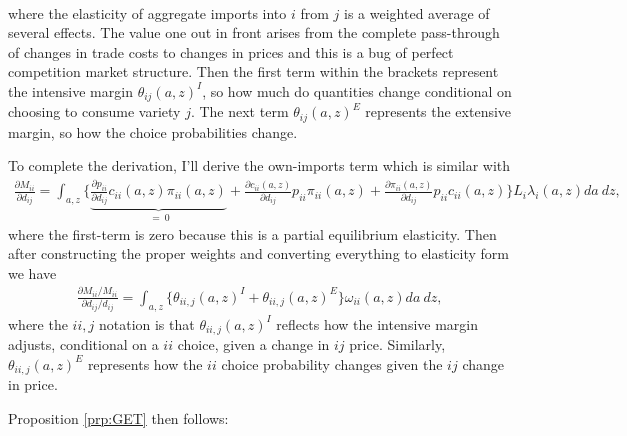 \documentclass[12pt,pdftex]{article}
\begin{document}
\begin{onehalfspacing}
\begin{align}
\end{align}
where the elasticity of aggregate imports into $i$ from $j$ is a weighted average of several effects. The value one out in front arises from the complete pass-through of changes in trade costs to changes in prices and this is a bug of perfect competition market structure. Then the first term within the brackets represent the intensive margin $\theta_{ij}(a,z)^{I}$, so how much do quantities change conditional on choosing to consume variety $j$. The next term $\theta_{ij}(a,z)^{E}$ represents the extensive margin, so how the choice probabilities change.

To complete the derivation, I'll derive the own-imports term which is similar with
\begin{align}
\frac{\partial  M_{ii}}{\partial d_{ij}} = \int_{a,z} \bigg \{ \underbrace{\frac{\partial p_{ii}}{\partial d_{ij}} c_{ii}(a,z) \pi_{ii}(a,z)}_{ \ = \ 0} +  \frac{\partial c_{ii}(a,z)}{\partial d_{ij}} p_{ii} \pi_{ii}(a,z) + \frac{\partial \pi_{ii}(a,z)}{\partial d_{ij}} p_{ii}c_{ii}(a,z) \bigg \} L_i \lambda_{i}(a,z)da \ dz,
\end{align}
where the first-term is zero because this is a partial equilibrium elasticity. Then after constructing the proper weights and converting everything to elasticity form we have
\begin{align}
\frac{\partial  M_{ii} / M_{ii}}{\partial d_{ij} / d_{ij}} = \int_{a,z} \bigg \{ \theta_{ii,j}(a,z)^{I} + \theta_{ii,j}(a,z)^{E} \bigg \}\omega_{ii}(a,z)da \ dz,
\end{align}
where the $ii, j$ notation is that $\theta_{ii,j}(a,z)^{I}$ reflects how the intensive margin adjusts, conditional on a $ii$ choice, given a change in $ij$ price. Similarly, $\theta_{ii,j}(a,z)^{E}$ represents how the $ii$ choice probability changes given the $ij$ change in price.

Proposition \ref{prp:GET} then follows:


\end{onehalfspacing}
\end{document}
